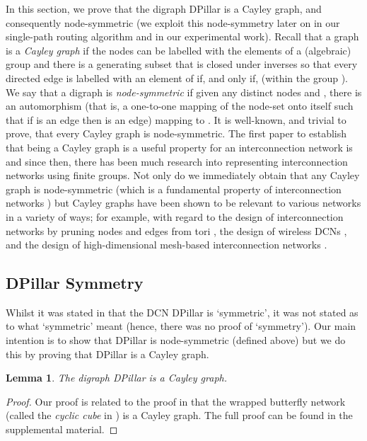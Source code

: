 \documentclass{article}
\newtheorem{lemma}[definition]{Lemma}
\begin{document}
In this section, we prove that the digraph DPillar is a Cayley graph,
and consequently node-symmetric (we exploit this node-symmetry later on in our
single-path routing algorithm and in our experimental work). Recall that a graph
is a \emph{Cayley graph} if the nodes can be labelled with the elements of a
(algebraic) group  and there is a generating subset  that is
closed under inverses so that every directed edge  is labelled with an
element of  if, and only if,  (within the group ). We say that
a digraph is \emph{node-symmetric} if given any  distinct nodes  and
, there is an automorphism (that is, a one-to-one mapping  of the
node-set onto itself such that if  is an edge then
 is an edge) mapping  to . It is well-known,
and trivial to prove, that every Cayley graph is node-symmetric. The first paper
to establish that being a Cayley graph is a useful property for an
interconnection network is \cite{AK89} and since then, there has been much
research into representing interconnection networks using finite groups. Not
only do we immediately obtain that any Cayley graph is node-symmetric (which is
a fundamental property of interconnection networks \cite{DT04}) but Cayley
graphs have been shown to be relevant to various networks in a variety of ways;
for example, with regard to the design of interconnection networks by pruning
nodes and edges from tori \cite{XB07}, the design of wireless DCNs \cite{SSW13},
and the design of high-dimensional mesh-based interconnection networks
\cite{CMB15}.

\subsection{DPillar Symmetry}\label{subsect:symDPillar}

Whilst it was stated in \cite{LYY12} that the DCN DPillar is `symmetric', it was not stated as to what `symmetric' meant (hence, there was no proof of `symmetry'). Our  main intention is to show that DPillar is node-symmetric (defined above) but we do this by proving that DPillar is a Cayley graph.

\begin{lemma}\label{lem:CayGra}
The digraph DPillar is a Cayley graph.
\end{lemma}

\begin{proof}
  Our proof is related to the proof in \cite{FC98} that the wrapped butterfly
  network (called the \emph{cyclic cube} in \cite{FC98}) is a Cayley graph.
  The full proof can be found in the supplemental material.
\end{proof}
\end{document}
